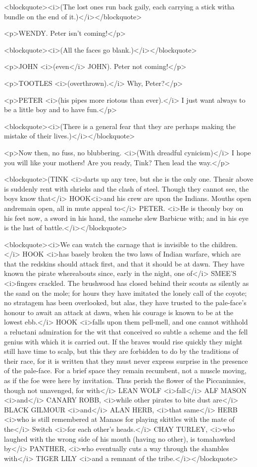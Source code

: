<blockquote><i>(The lost ones run back gaily, each carrying a stick witha bundle on the end of it.)</i></blockquote>

<p>WENDY. Peter isn't coming!</p>

<blockquote><i>(All the faces go blank.)</i></blockquote>

<p>JOHN <i>(even</i> JOHN). Peter not coming!</p>

<p>TOOTLES <i>(overthrown).</i> Why, Peter?</p>

<p>PETER <i>(his pipes more riotous than ever).</i> I just want always to be a little boy and to have fun.</p>

<blockquote><i>(There is a general fear that they are perhaps making the mistake of their lives.)</i></blockquote>

<p>Now then, no fuss, no blubbering. <i>(With dreadful cynicism)</i> I hope you will like your mothers! Are you ready, Tink? Then lead the way.</p>

<blockquote>(TINK <i>darts up any tree, but she is the only one. Theair above is suddenly rent with shrieks and the clash of steel. Though they cannot see, the boys know that</i> HOOK<i>and his crew are upon the Indians. Mouths open andremain open, all in mute appeal to</i> PETER. <i>He is theonly boy on his feet now, a sword in his hand, the samehe slew Barbicue with; and in his eye is the lust of battle.</i></blockquote>

<blockquote><i>We can watch the carnage that is invisible to the children.</i> HOOK <i>has basely broken the two laws of Indian warfare, which are that the redskins should attack first, and that it should be at dawn. They have known the pirate whereabouts since, early in the night, one of</i> SMEE'S <i>fingers crackled. The brushwood has closed behind their scouts as silently as the sand on the mole; for hours they have imitated the lonely call of the coyote; no stratagem has been overlooked, but alas, they have trusted to the pale-face's honour to await an attack at dawn, when his courage is known to be at the lowest ebb.</i> HOOK <i>falls upon them pell-mell, and one cannot withhold a reluctani admiration for the wit that conceived so subtle a scheme and the fell genius with which it is carried out. If the braves would rise quickly they might still have time to scalp, but this they are forbidden to do by the traditions of their race, for it is written that they must never express surprise in the presence of the pale-face. For a brief space they remain recumbent, not a muscle moving, as if the foe were here by invitation. Thus perish the flower of the Piccaninnies, though not unavenged, for with</i> LEAN WOLF <i>fall</i> ALF MASON <i>and</i> CANARY ROBB, <i>while other pirates to bite dust are</i> BLACK GILMOUR <i>and</i> ALAN HERB, <i>that same</i> HERB <i>who is still remembered at Manaos for playing skittles with the mate of the</i> Switch <i>for each other's heads.</i> CHAY TURLEY, <i>who laughed with the wrong side of his mouth (having no other), is tomahawked by</i> PANTHER, <i>who eventually cuts a way through the shambles with</i> TIGER LILY <i>and a remnant of the tribe.</i></blockquote>

